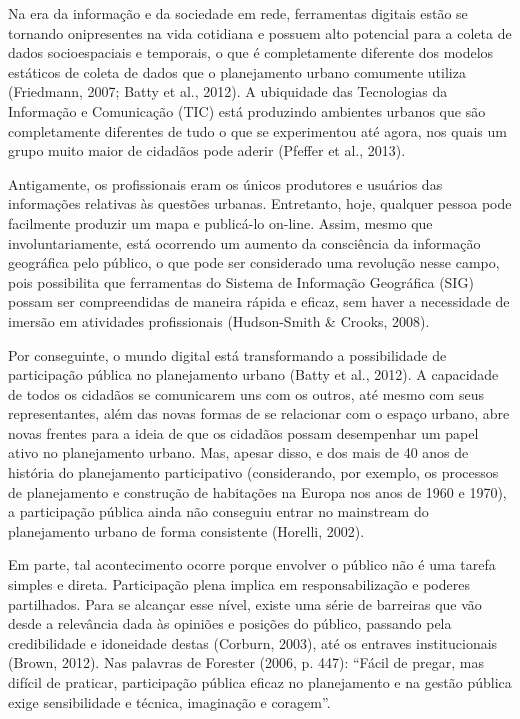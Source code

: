 \documentclass{article}
\begin{document}
Na era da informação e da sociedade em rede, ferramentas digitais estão se
tornando
onipresentes na vida cotidiana e possuem alto potencial para a coleta de dados
socioespaciais e temporais, o que é completamente diferente dos modelos
estáticos de
coleta de dados que o planejamento urbano comumente utiliza (Friedmann, 2007;
Batty et
al., 2012). A ubiquidade das Tecnologias da Informação e Comunicação
(TIC) está produzindo ambientes urbanos que são completamente diferentes de tudo
o
que se experimentou até agora, nos quais um grupo muito maior de cidadãos pode
aderir (Pfeffer et al., 2013).

Antigamente, os profissionais eram os únicos produtores e usuários das
informações
relativas às questões urbanas. Entretanto, hoje, qualquer pessoa pode facilmente
produzir um mapa e publicá-lo on-line. Assim, mesmo que involuntariamente, está
ocorrendo um aumento da consciência da informação geográfica pelo público, o que
pode ser considerado uma revolução nesse campo, pois possibilita que ferramentas
do
Sistema de Informação Geográfica (SIG) possam ser compreendidas de maneira
rápida e
eficaz, sem haver a necessidade de imersão em atividades profissionais
(Hudson-Smith \& Crooks, 2008).

Por conseguinte, o mundo digital está transformando a possibilidade de
participação
pública no planejamento urbano (Batty et al.,
2012). A capacidade de todos os cidadãos se comunicarem uns com os
outros, até mesmo com seus representantes, além das novas formas de se
relacionar
com o espaço urbano, abre novas frentes para a ideia de que os cidadãos possam
desempenhar um papel ativo no planejamento urbano. Mas, apesar disso, e dos mais
de
40 anos de história do planejamento participativo (considerando, por exemplo, os
processos de planejamento e construção de habitações na Europa nos anos de 1960
e
1970), a participação pública ainda não conseguiu entrar no
mainstream do planejamento urbano de forma consistente (Horelli, 2002).

Em parte, tal acontecimento ocorre porque envolver o público não é uma tarefa
simples
e direta. Participação plena implica em responsabilização e poderes partilhados.
Para se alcançar esse nível, existe uma série de barreiras que vão desde a
relevância dada às opiniões e posições do público, passando pela credibilidade e
idoneidade destas (Corburn, 2003), até os
entraves institucionais (Brown, 2012). Nas
palavras de Forester (2006, p. 447): “Fácil
de pregar, mas difícil de praticar, participação pública eficaz no planejamento
e na
gestão pública exige sensibilidade e técnica, imaginação e coragem”.
\end{document}

